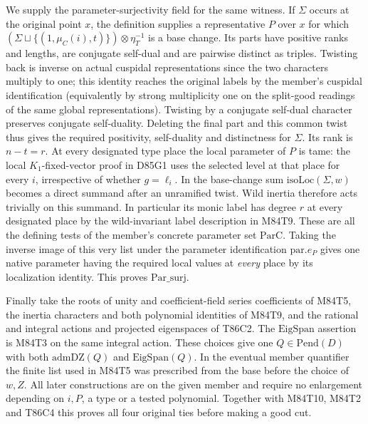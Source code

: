 We supply the parameter-surjectivity field for the same witness.
If $\Sigma$ occurs at the original point $x$, the definition
supplies a representative $P$ over $x$ for which
$(\Sigma\sqcup\{(1,\mu_C(i),t)\})\otimes\eta_T^{-1}$
is a base change. Its parts have positive ranks and lengths,
are conjugate self-dual and are pairwise distinct as triples.
Twisting back is inverse on actual cuspidal representations
since the two characters multiply to one; this identity reaches
the original labels by the member's cuspidal identification
(equivalently by strong multiplicity one on the split-good
readings of the same global representations). Twisting by a
conjugate self-dual character preserves conjugate self-duality.
Deleting the final part and this common twist thus gives the
required positivity, self-duality and distinctness for $\Sigma$.
Its rank is $n-t=r$. At every designated type place the local
parameter of $P$ is tame: the local $K_1$-fixed-vector proof
in D85G1 uses the selected level at that place for every $i$,
irrespective of whether $g=\ell_i$. In the base-change sum
$\mathrm{isoLoc}(\Sigma,w)$ becomes a direct summand after an
unramified twist. Wild inertia therefore acts trivially on this
summand. In particular its monic label has degree $r$ at every
designated place by the wild-invariant label description in
M84T9. These are all the defining tests of the member's
concrete parameter set $\mathrm{ParC}$. Taking the inverse image
of this very list under the parameter identification
$\mathrm{par}.e_P$ gives one native parameter having the required
local values at \emph{every} place by its localization identity.
This proves $\mathrm{Par\_surj}$.

Finally take the roots of unity and coefficient-field series
coefficients of M84T5, the inertia characters and both polynomial
identities of M84T9, and the rational and integral actions and
projected eigenspaces of T86C2. The $\mathrm{EigSpan}$ assertion
is M84T3 on the same integral action. These choices give one
$Q\in\mathrm{Pend}(D)$ with both $\mathrm{admDZ}(Q)$ and
$\mathrm{EigSpan}(Q)$. In the eventual member quantifier the
finite list used in M84T5 was prescribed from the base before
the choice of $w,Z$. All later constructions are on the given
member and require no enlargement depending on $i,P$, a type
or a tested polynomial. Together with M84T10, M84T2 and T86C4
this proves all four original ties before making a good cut.
